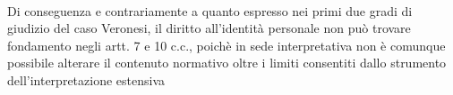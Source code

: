 \\Di conseguenza e contrariamente a quanto espresso nei primi due gradi di giudizio del caso Veronesi, il diritto all'identità personale non può trovare fondamento negli artt. 7 e 10 c.c., poichè in sede interpretativa non è comunque possibile alterare il contenuto normativo oltre i limiti consentiti dallo strumento dell'interpretazione estensiva%
